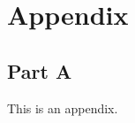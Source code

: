 \newpage
\appendix
\section{Appendix}

\subsection*{Part A} \label{anhang:zusatz1}

This is an appendix.

\clearpage